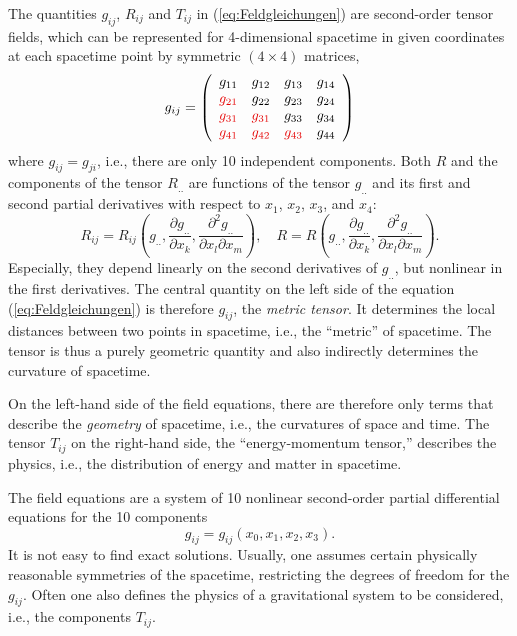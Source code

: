 The quantities $g_{ij}$, $R_{ij}$ and $T_{ij}$ in (\ref{eq:Feldgleichungen}) are
second-order tensor fields, 
which can be represented for 4-dimensional 
spacetime in given coordinates at each spacetime point
by symmetric $(4 \times 4)$ matrices,
\begin{equation}
	g_{ij}
	= \left(\begin{array}{cccc}
		g_{11} & g_{12} & g_{13} & g_{14} \\
		\rot{$g_{21}$} & g_{22} & g_{23} & g_{24} \\
		\rot{$g_{31}$} & \rot{$g_{31}$} & g_{33} & g_{34} \\
		\rot{$g_{41}$} & \rot{$g_{42}$} & \rot{$g_{43}$} & g_{44}
	\end{array}\right)
\end{equation}
where $g_{ij} = g_{ji}$, i.e., there are only 10 independent components.
Both $R$ and the components of the tensor %
$R_{..}$ are 
functions of the tensor $g_{..}$ and its 
first and second partial derivatives with respect to 
$x_1$, $x_2$, $x_3$, and $x_4$:
\[
	R_{ij}
	= R_{ij} \left(
		g_{..}, 
		\frac{\partial g_{..}}{\partial x_k},
		\frac{\partial^2 g_{..}}{\partial x_l \partial x_m}
	\right),
	\quad
	R =
	R \left(
		g_{..}, 
		\frac{\partial g_{..}}{\partial x_k},
		\frac{\partial^2 g_{..}}{\partial x_l \partial x_m}
	\right).
\]
Especially, they depend linearly on the second derivatives of $g_{..}$, but nonlinear in the first derivatives.
The central quantity on the left side of the equation
(\ref{eq:Feldgleichungen})
is therefore $g_{ij}$,
the \emph{metric tensor}.
It determines the local distances between two points in
spacetime, i.e., the “metric” of spacetime.
The tensor is thus a purely geometric quantity and
also indirectly determines the curvature of spacetime.

On the left-hand side of the field equations, there are therefore only
terms that describe the \emph{geometry} of spacetime, i.e., the
curvatures of space and time.
The tensor $T_{ij}$ on the right-hand side,
the “energy-momentum tensor,”
describes the physics, 
i.e., the distribution of energy and 
matter in spacetime.

%
The field equations are a system of 10 nonlinear
second-order partial differential equations for the 10 components %
\[
    g_{ij}
    = g_{ij}(x_0, x_1, x_2, x_3).
\]
It is not easy to find exact solutions. 
Usually, one assumes certain physically reasonable symmetries of the spacetime, restricting the degrees of freedom for the $g_{ij}$. Often one also defines the physics of a gravitational system to be considered, i.e., the components $T_{ij}$.

